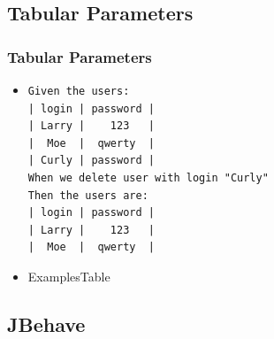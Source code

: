 \documentclass[14pt]{beamer}
\begin{document}
\subsection{Tabular Parameters}
\begin{frame}[fragile]
\frametitle{Tabular Parameters}
\begin{itemize}
\item \begin{lstlisting}[morekeywords={Given,When,Then}, basicstyle=\small\ttfamily, keywordstyle=\color{myOrange}]
Given the users:
| login | password |
| Larry |    123   |
|  Moe  |  qwerty  |
| Curly | password |
When we delete user with login "Curly"
Then the users are:
| login | password |
| Larry |    123   |
|  Moe  |  qwerty  |
\end{lstlisting}
\item ExamplesTable
\end{itemize}
\end{frame}

\subsection{JBehave}
\end{document}
